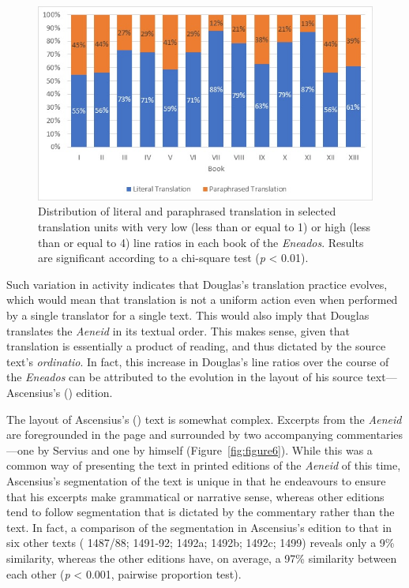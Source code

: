 \documentclass{dhbenelux}
\begin{document}
\begin{figure}[H]
\begin{center}
\includegraphics[width=1\linewidth]{Images/Figure5.jpg}
\end{center}
\caption{Distribution of literal and paraphrased translation in selected translation units with very low (less than or equal to 1) or high (less than or equal to 4) line ratios in each book of the \emph{Eneados}.  Results are significant according to a chi-square test (\emph{p} < 0.01).}
\label{fig:figure5}
\end{figure}

Such variation in activity indicates that Douglas's translation practice
evolves, which would mean that translation is not a uniform action even
when performed by a single translator for a single text. This would also
imply that Douglas translates the \emph{Aeneid} in its textual order.
This makes sense, given that translation is essentially a product of
reading, and thus dictated by the source text's \emph{ordinatio}. In
fact, this increase in Douglas's line ratios over the course of the
\emph{Eneados} can be attributed to the evolution in the layout of his
source text---Ascensius's (\citeyear{virgil1501}) edition.

The layout of Ascensius's (\citeyear{virgil1501}) text is somewhat complex. Excerpts from the
\emph{Aeneid} are foregrounded in the page and surrounded by two
accompanying commentaries---one by Servius and one by himself (Figure~\ref{fig:figure6}). While this was a common way of presenting the text in printed
editions of the \emph{Aeneid} of this time, Ascensius's segmentation of
the text is unique in that he endeavours to ensure that his excerpts
make grammatical or narrative sense, whereas other editions tend to
follow segmentation that is dictated by the commentary rather than the
text. In fact, a comparison of the segmentation in Ascensius's edition
to that in six other texts (\citeauthor{virgil1487} 1487/88; \citeauthor{virgil1491} 1491-92; \citeauthor{virgil1492antonius} 1492a; \citeauthor{virgil1492liga} 1492b; \citeauthor{virgil1492anton} 1492c; \citeauthor{virgil1499} 1499) reveals
only a 9\% similarity, whereas the other editions have, on average, a
97\% similarity between each other (\emph{p} \textless{} 0.001, pairwise
proportion test).
\end{document}
